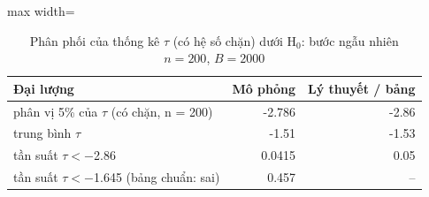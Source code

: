 \begin{table}[H]
\centering\footnotesize
\caption{Phân phối của thống kê $\tau$ (có hệ số chặn) dưới H$_0$: bước ngẫu nhiên $n=200$, $B=2000$}\label{tab:tab_b12_04_null_distribution}
\begin{adjustbox}{max width=\linewidth}
\begin{tabular}{|>{\raggedright\arraybackslash}p{}|r|r|}
\toprule
Đại lượng & Mô phỏng & Lý thuyết / bảng \\
\midrule
phân vị 5\% của $\tau$ (có chặn, n = 200) & -2.786 & -2.86 \\[3pt]
trung bình $\tau$ & -1.51 & -1.53 \\[3pt]
tần suất $\tau < -$2.86 & 0.0415 & 0.05 \\[3pt]
tần suất $\tau < -$1.645 (bảng chuẩn: sai) & 0.457 & – \\[3pt]
\bottomrule
\end{tabular}
\end{adjustbox}
\end{table}
